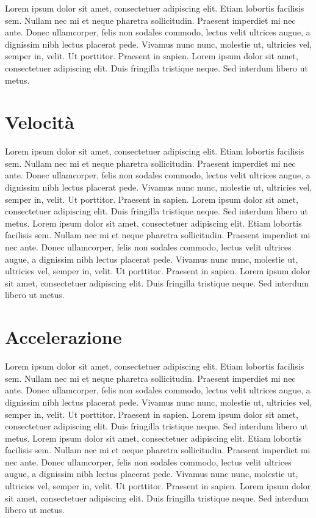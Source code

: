 \documentclass{book}
\begin{document}
Lorem ipsum dolor sit amet, consectetuer adipiscing elit. Etiam lobortis facilisis
sem. Nullam nec mi et neque pharetra sollicitudin. Praesent imperdiet mi nec
ante. Donec ullamcorper, felis non sodales commodo, lectus velit ultrices augue,
a dignissim nibh lectus placerat pede. Vivamus nunc nunc, molestie ut, ultricies
vel, semper in, velit. Ut porttitor. Praesent in sapien. Lorem ipsum dolor sit
amet, consectetuer adipiscing elit. Duis fringilla tristique neque. Sed interdum
libero ut metus.

\section{Velocità}
Lorem ipsum dolor sit amet, consectetuer adipiscing elit. Etiam lobortis facilisis
sem. Nullam nec mi et neque pharetra sollicitudin. Praesent imperdiet mi nec
ante. Donec ullamcorper, felis non sodales commodo, lectus velit ultrices augue,
a dignissim nibh lectus placerat pede. Vivamus nunc nunc, molestie ut, ultricies
vel, semper in, velit. Ut porttitor. Praesent in sapien. Lorem ipsum dolor sit
amet, consectetuer adipiscing elit. Duis fringilla tristique neque. Sed interdum
libero ut metus.
Lorem ipsum dolor sit amet, consectetuer adipiscing elit. Etiam lobortis facilisis
sem. Nullam nec mi et neque pharetra sollicitudin. Praesent imperdiet mi nec
ante. Donec ullamcorper, felis non sodales commodo, lectus velit ultrices augue,
a dignissim nibh lectus placerat pede. Vivamus nunc nunc, molestie ut, ultricies
vel, semper in, velit. Ut porttitor. Praesent in sapien. Lorem ipsum dolor sit
amet, consectetuer adipiscing elit. Duis fringilla tristique neque. Sed interdum
libero ut metus. 

\section{Accelerazione}
Lorem ipsum dolor sit amet, consectetuer adipiscing elit. Etiam lobortis facilisis
sem. Nullam nec mi et neque pharetra sollicitudin. Praesent imperdiet mi nec
ante. Donec ullamcorper, felis non sodales commodo, lectus velit ultrices augue,
a dignissim nibh lectus placerat pede. Vivamus nunc nunc, molestie ut, ultricies
vel, semper in, velit. Ut porttitor. Praesent in sapien. Lorem ipsum dolor sit
amet, consectetuer adipiscing elit. Duis fringilla tristique neque. Sed interdum
libero ut metus.
Lorem ipsum dolor sit amet, consectetuer adipiscing elit. Etiam lobortis facilisis
sem. Nullam nec mi et neque pharetra sollicitudin. Praesent imperdiet mi nec
ante. Donec ullamcorper, felis non sodales commodo, lectus velit ultrices augue,
a dignissim nibh lectus placerat pede. Vivamus nunc nunc, molestie ut, ultricies
vel, semper in, velit. Ut porttitor. Praesent in sapien. Lorem ipsum dolor sit
amet, consectetuer adipiscing elit. Duis fringilla tristique neque. Sed interdum
libero ut metus. 
\end{document}
